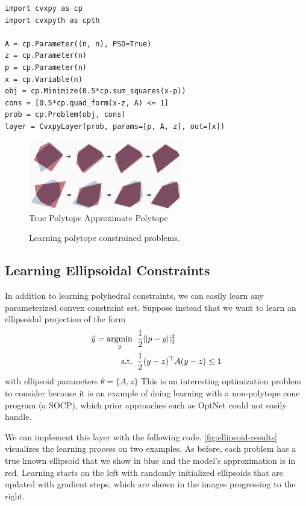 \begin{lstlisting}
import cvxpy as cp
import cvxpyth as cpth

A = cp.Parameter((n, n), PSD=True)
z = cp.Parameter(n)
p = cp.Parameter(n)
x = cp.Variable(n)
obj = cp.Minimize(0.5*cp.sum_squares(x-p))
cons = [0.5*cp.quad_form(x-z, A) <= 1]
prob = cp.Problem(obj, cons)
layer = CvxpyLayer(prob, params=[p, A, z], out=[x])
\end{lstlisting}

\begin{figure}[t]
  \centering
  \includegraphics[width=0.6\textwidth]{polytope-frames.png} \\
   True Polytope \enskip
   Approximate Polytope
  \caption{
    Learning polytope constrained problems.
  }
  \label{fig:polytope-results}
\end{figure}

\newpage
\subsection{Learning Ellipsoidal Constraints}
In addition to learning polyhedral constraints, we can easily
learn any parameterized convex constraint set.
Suppose instead that we want to learn an ellipsoidal
projection of the form
\begin{align*}
\hat y = \operatorname*{argmin}_y\;\; &\frac{1}{2}||p-y||_2^2  \\
 {\rm s.t.}\;\; & \frac{1}{2}(y-z)^\top A(y-z) \leq 1
\end{align*}
with ellipsoid parameters $\theta=\{A,z\}$
This is an interesting optimization problem to consider because
it is an example of doing learning with a non-polytope
cone program (a SOCP), which prior approaches such as OptNet
could not easily handle.

We can implement this layer with the following code.
\cref{fig:ellipsoid-results} visualizes the learning process
on two examples.
As before, each problem has a true known ellipsoid that we show in blue
and the model's approximation is in red.
Learning starts on the left with randomly initialized
ellipsoids that are updated with gradient steps,
which are shown in the images progressing to the right.

